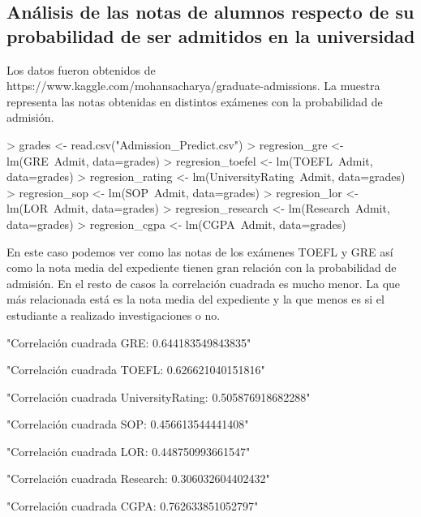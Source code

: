 \documentclass [a4paper] {article}
\begin{document}
\subsection{Análisis de las notas de alumnos respecto de su probabilidad de ser admitidos en la universidad}
Los datos fueron obtenidos de https://www.kaggle.com/mohansacharya/graduate-admissions.
La muestra representa las notas obtenidas en distintos exámenes con la probabilidad de admisión.
\begin{Schunk}
\begin{Sinput}
> grades <- read.csv("Admission_Predict.csv")
> regresion_gre <- lm(GRE~Admit, data=grades)
> regresion_toefel <- lm(TOEFL~Admit, data=grades)
> regresion_rating <- lm(UniversityRating~Admit, data=grades)
> regresion_sop <- lm(SOP~Admit, data=grades)
> regresion_lor <- lm(LOR~Admit, data=grades)
> regresion_research <- lm(Research~Admit, data=grades)
> regresion_cgpa <- lm(CGPA~Admit, data=grades)
\end{Sinput}
\end{Schunk}
En este caso podemos ver como las notas de los exámenes TOEFL y GRE así como la nota media del expediente tienen gran relación con la probabilidad de admisión.
En el resto de casos la correlación cuadrada es mucho menor.
La que más relacionada está es la nota media del expediente y la que menos es si el estudiante a realizado investigaciones o no.
\begin{Schunk}
\begin{Soutput}
[1] "Correlación cuadrada GRE: 0.644183549843835"
\end{Soutput}
\begin{Soutput}
[1] "Correlación cuadrada TOEFL: 0.626621040151816"
\end{Soutput}
\begin{Soutput}
[1] "Correlación cuadrada UniversityRating: 0.505876918682288"
\end{Soutput}
\begin{Soutput}
[1] "Correlación cuadrada SOP: 0.456613544441408"
\end{Soutput}
\begin{Soutput}
[1] "Correlación cuadrada LOR: 0.448750993661547"
\end{Soutput}
\begin{Soutput}
[1] "Correlación cuadrada Research: 0.306032604402432"
\end{Soutput}
\begin{Soutput}
[1] "Correlación cuadrada CGPA: 0.762633851052797"
\end{Soutput}
\end{Schunk}
\end{document}
